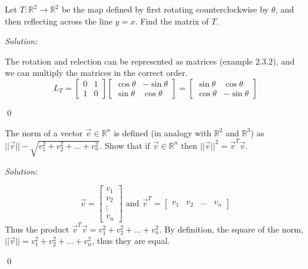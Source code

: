 \documentclass[11 pt]{article}
\newenvironment{problem}[2][Problem]{\begin{trivlist}
\item[\hskip \labelsep {\bfseries #1}\hskip \labelsep {\bfseries #2.}]}{\end{trivlist}}
\newenvironment{sol}
    {\emph{Solution:}
    }
    {
    \qed
    }
\newcommand{\R}{\mathbb{R}} %
\begin{document}







\begin{problem}{2.3.4} 
Let $T: \R^2\to\R^2$ be the map defined by first rotating counterclockwise by $\theta$, and then reflecting across the line $y=x$. Find the matrix of $T$.
\end{problem}
\begin{sol}
The rotation and relection can be represented as matrices (example 2.3.2), and we can multiply the matrices in the correct order.
\[L_T = \begin{bmatrix}0 & 1\\1& 0\end{bmatrix}\begin{bmatrix}\cos \theta & -\sin \theta \\ \sin \theta & \cos \theta \end{bmatrix}=\begin{bmatrix}\sin \theta & \cos \theta \\ \cos \theta & -\sin \theta \end{bmatrix}\]
\end{sol}

\begin{problem}{2.3.8}
The norm of a vector $\vec{v}\in\R^n$ is defined (in analogy with $\R^2$ and $\R^3$) as $||\vec{v}|| - \sqrt{v_1^2+v_2^2+\dots+v_n^2}$. Show that if $\vec{v} \in \R^n$ then $||\vec{v}||^2=\vec{v}^T\vec{v}$.
\end{problem}
\begin{sol}
\[\vec{v}=\begin{bmatrix}
v_1\\v_2\\\vdots\\v_n
\end{bmatrix}\text{ and } \vec{v}^T=\begin{bmatrix}
v_1 & v_2 & \dots & v_n
\end{bmatrix}\]
Thus the product $\vec{v}^T\vec{v}=v_1^2+v_2^2+\dots+v_n^2$. By definition, the square of the norm, $||\vec{v}||=v_1^2+v_2^2+\dots+v_n^2$, thus they are equal.
\end{sol}
\end{document}
